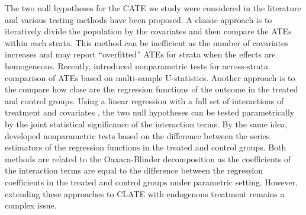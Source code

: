 \documentclass[
  12pt,
  12pt]{article}
\numberwithin{equation}{section}
\theoremstyle{definition}
\theoremstyle{plain}
\theoremstyle{plain}
\theoremstyle{remark}
\begin{document}
The two null hypotheses for the CATE we study were considered in the
literature and various testing methods have been proposed. A classic
approach is to iteratively divide the population by the covariates and
then compare the ATEs within each strata. This method can be inefficient
as the number of covariates increases and may report ``overfitted'' ATEs
for strata when the effects are homogeneous. Recently,
\citet{dai2021nonparametric} introduced nonparametric tests for
across-strata comparison of ATEs based on multi-sample U-statistics.
Another approach is to the compare how close are the regression
functions of the outcome in the treated and control groups. Using a
linear regression with a full set of interactions of treatment and
covariates \citep[Chapter 5.3]{imbens2009recent}, the two null
hypotheses can be tested parametrically by the joint statistical
significance of the interaction terms. By the same idea,
\citet{crump2008nonparametric} developed nonparametric tests based on
the difference between the series estimators of the regression functions
in the treated and control groups. Both methods are related to the
Oaxaca-Blinder decomposition as the coefficients of the interaction
terms are equal to the difference between the regression coefficients in
the treated and control groups under parametric setting. However,
extending these approaches to CLATE with endogenous treatment remains a
complex issue.
\end{document}
